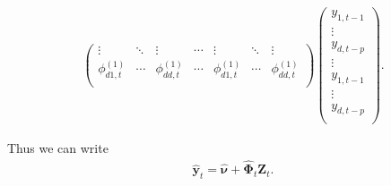 \documentclass[fleqn]{article}
\begin{document}
\begin{align*}
\begin{pmatrix}
        \vdots & \ddots & \vdots
        & \cdots &
        \vdots & \ddots & \vdots \\
        \phi^{(1)}_{d1, t} & \cdots & \phi^{(1)}_{dd, t}
        & \cdots &
        \phi^{(1)}_{d1, t} & \cdots & \phi^{(1)}_{dd, t} \\
    \end{pmatrix}
    \begin{pmatrix}
        y_{1, t-1} \\
        \vdots \\
        y_{d, t-p} \\
        \vdots \\
        y_{1, t-1} \\
        \vdots \\
        y_{d, t-p} \\
    \end{pmatrix}.
\end{align*}

Thus we can write
\begin{align*}
    \hat{\bm y}_t = \hat{\bm \nu} + \hat{\bm \Phi}_t \bm Z_t. 
\end{align*}
\end{document}
